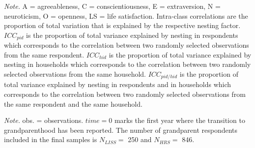 \documentclass[
  english,
  man, noextraspace]{apa7}
\newenvironment{lltable}{\begin{landscape}\begin{center}\begin{ThreePartTable}}{\end{ThreePartTable}\end{center}\end{landscape}}
\begin{document}
\begin{appendix}
\begin{table}[h]
\begin{center}
\begin{threeparttable}
\begin{tablenotes}[para]
\normalsize{\textit{Note.} A = agreeableness, C = conscientiousness, E = extraversion, N = neuroticism, O = openness, LS = life satisfaction. Intra-class correlations are the proportion of total variation that is explained by the respective nesting factor. $ICC_{pid}$ is the proportion of total variance explained by nesting in respondents which corresponds to the correlation between two randomly selected observations from the same respondent. $ICC_{hid}$ is the proportion of total variance explained by nesting in households which corresponds to the correlation between two randomly selected observations from the same household. $ICC_{pid/hid}$ is the proportion of total variance explained by nesting in respondents and in households which corresponds to the correlation between two randomly selected observations from the same respondent and the same household.}
\end{tablenotes}

\end{threeparttable}
\end{center}

\end{table}










\begin{lltable}

\begin{TableNotes}[para]
\normalsize{\textit{Note.} obs. = observations. \(time=0\) marks
the first year where the transition to grandparenthood has been
reported. The number of grandparent respondents included in the final
samples is \(N_{LISS}=\) 250 and \(N_{HRS}=\) 846.}
\end{TableNotes}

\small{

}
\end{lltable}
\end{appendix}
\end{document}
